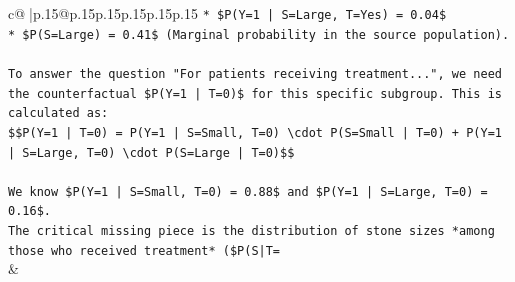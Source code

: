 \documentclass{article}
\begin{document}
{\begin{supertabular}{c@{$\;$}|p{.15\linewidth}@{}p{.15\linewidth}p{.15\linewidth}p{.15\linewidth}p{.15\linewidth}p{.15\linewidth}}
{{{\texttt{*   \$P(Y=1 | S=Large, T=Yes) = 0.04\$} \\
\texttt{*   \$P(S=Large) = 0.41\$ (Marginal probability in the source population).} \\
\\ 
\texttt{To answer the question "For patients receiving treatment...", we need the counterfactual \$P(Y=1 | T=0)\$ for this specific subgroup. This is calculated as:} \\
\texttt{\$\$P(Y=1 | T=0) = P(Y=1 | S=Small, T=0) \textbackslash{}cdot P(S=Small | T=0) + P(Y=1 | S=Large, T=0) \textbackslash{}cdot P(S=Large | T=0)\$\$} \\
\\ 
\texttt{We know \$P(Y=1 | S=Small, T=0) = 0.88\$ and \$P(Y=1 | S=Large, T=0) = 0.16\$.} \\
\texttt{The critical missing piece is the distribution of stone sizes *among those who received treatment* (\$P(S|T=} \\
            }
        }
    }
    & \\ \\


\end{supertabular}}
\end{document}
